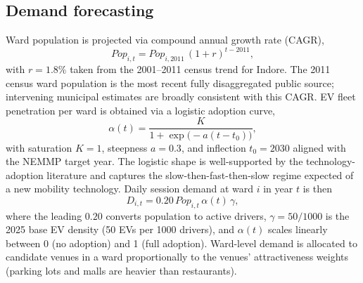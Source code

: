 \documentclass[conference]{IEEEtran}
\begin{document}
\subsection{Demand forecasting}
\label{subsec:demand}
Ward population is projected via compound annual growth rate (CAGR),
\begin{equation}
\label{eq:pop_cagr}
\mathit{Pop}_{i,t}=\mathit{Pop}_{i,2011}\,(1+r)^{t-2011},
\end{equation}
with $r{=}1.8\%$ taken from the 2001--2011 census trend for
Indore. The 2011 census ward population is the most recent fully
disaggregated public source; intervening municipal estimates are
broadly consistent with this CAGR. EV fleet penetration per ward
is obtained via a logistic adoption curve,
\begin{equation}
\label{eq:logistic}
\alpha(t)=\frac{K}{1+\exp\!\bigl(-a(t-t_{0})\bigr)},
\end{equation}
with saturation $K{=}1$, steepness $a{=}0.3$, and inflection
$t_{0}{=}2030$ aligned with the NEMMP target year. The logistic
shape is well-supported by the technology-adoption literature and
captures the slow-then-fast-then-slow regime expected of a new
mobility technology. Daily session demand at ward $i$ in year $t$
is then
\begin{equation}
\label{eq:daily_demand}
D_{i,t}=0.20\,\mathit{Pop}_{i,t}\,\alpha(t)\,\gamma,
\end{equation}
where the leading $0.20$ converts population to active drivers,
$\gamma{=}50/1000$ is the 2025 base EV density (50 EVs per 1000
drivers), and $\alpha(t)$ scales linearly between 0 (no adoption)
and 1 (full adoption). Ward-level demand is allocated to candidate
venues in a ward proportionally to the venues' attractiveness
weights (parking lots and malls are heavier than restaurants).
\end{document}
